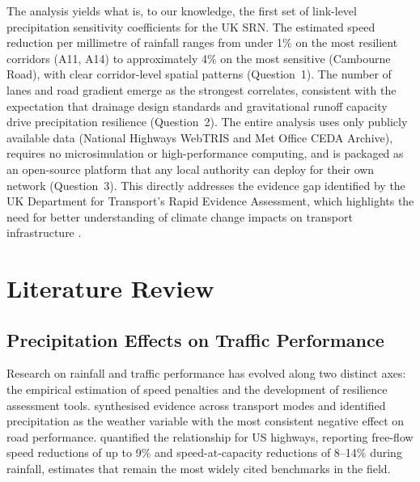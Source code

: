 \documentclass[review,authoryear]{elsarticle}
\begin{document}
The analysis yields what is, to our knowledge, the first set of link-level precipitation sensitivity coefficients for the UK SRN. The estimated speed reduction per millimetre of rainfall ranges from under 1\% on the most resilient corridors (A11, A14) to approximately 4\% on the most sensitive (Cambourne Road), with clear corridor-level spatial patterns (Question~1). The number of lanes and road gradient emerge as the strongest correlates, consistent with the expectation that drainage design standards and gravitational runoff capacity drive precipitation resilience (Question~2). The entire analysis uses only publicly available data (National Highways WebTRIS and Met Office CEDA Archive), requires no microsimulation or high-performance computing, and is packaged as an open-source platform that any local authority can deploy for their own network (Question~3). This directly addresses the evidence gap identified by the UK Department for Transport's Rapid Evidence Assessment, which highlights the need for better understanding of climate change impacts on transport infrastructure \citep{dft2024rea}.


\section{Literature Review}
\label{sec:lit}

\subsection{Precipitation Effects on Traffic Performance}
\label{sec:lit:precip}

Research on rainfall and traffic performance has evolved along two distinct axes: the empirical estimation of speed penalties and the development of resilience assessment tools. \citet{koetse2009impact} synthesised evidence across transport modes and identified precipitation as the weather variable with the most consistent negative effect on road performance. \citet{hranac2006empirical} quantified the relationship for US highways, reporting free-flow speed reductions of up to 9\% and speed-at-capacity reductions of 8--14\% during rainfall, estimates that remain the most widely cited benchmarks in the field.
\end{document}
